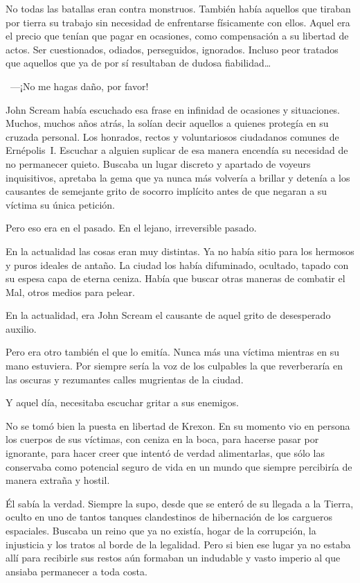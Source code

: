 No todas las batallas eran contra monstruos. También había aquellos que tiraban por tierra su trabajo sin necesidad de enfrentarse físicamente con ellos. Aquel era el precio que tenían que pagar en ocasiones, como compensación a su libertad de actos. Ser cuestionados, odiados, perseguidos, ignorados.
Incluso peor tratados que aquellos que ya de por sí resultaban de dudosa fiabilidad\dots

\fancyparbreak
~---¡No me hagas daño, por favor!

John Scream había escuchado esa frase en infinidad de ocasiones y situaciones. Muchos, muchos años atrás, la solían decir aquellos a quienes protegía en su cruzada personal. Los honrados, rectos y voluntariosos ciudadanos comunes de Ernépolis~I. Escuchar a alguien suplicar de esa manera encendía su necesidad de no permanecer quieto. Buscaba un lugar discreto y apartado de voyeurs inquisitivos, apretaba la gema que ya nunca más volvería a brillar y detenía a los causantes de semejante grito de socorro implícito antes de que negaran a su víctima su única petición.

Pero eso era en el pasado. En el lejano, irreversible pasado.

En la actualidad las cosas eran muy distintas. Ya no había sitio para los hermosos y puros ideales de antaño. La ciudad los había difuminado, ocultado, tapado con su espesa capa de eterna ceniza. Había que buscar otras maneras de combatir el Mal, otros medios para pelear.

En la actualidad, era John Scream el causante de aquel grito de desesperado auxilio.

Pero era otro también el que lo emitía. Nunca más una víctima mientras en su mano estuviera. Por siempre sería la voz de los culpables la que reverberaría en las oscuras y rezumantes calles mugrientas de la ciudad.

Y aquel día, necesitaba escuchar gritar a sus enemigos.

No se tomó bien la puesta en libertad de Krexon. En su momento vio en persona los cuerpos de sus víctimas, con ceniza en la boca, para hacerse pasar por ignorante, para hacer creer que intentó de verdad alimentarlas, que sólo las conservaba como potencial seguro de vida en un mundo que siempre percibiría de manera extraña y hostil.

Él sabía la verdad. Siempre la supo, desde que se enteró de su llegada a la Tierra, oculto en uno de tantos tanques clandestinos de hibernación de los cargueros espaciales. Buscaba un reino que ya no existía, hogar de la corrupción, la injusticia y los tratos al borde de la legalidad. Pero si bien ese lugar ya no estaba allí para recibirle sus restos aún formaban un indudable y vasto imperio al que ansiaba permanecer a toda costa.

